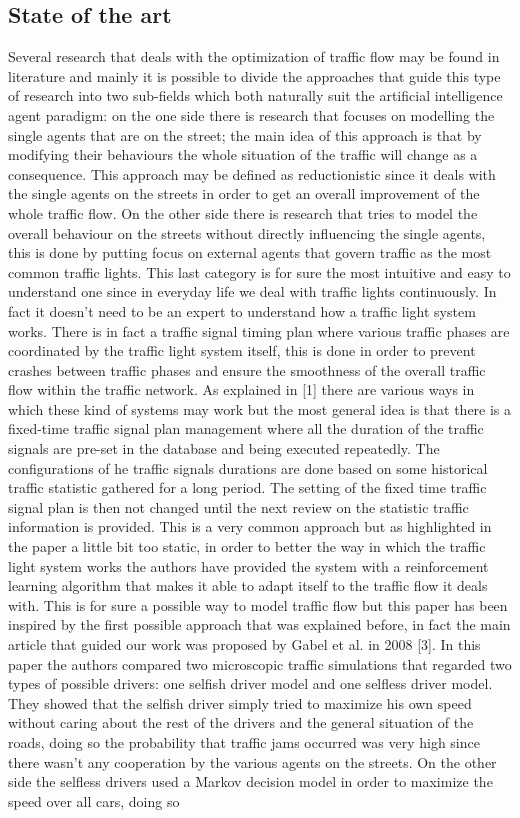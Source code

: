 \documentclass[a4paper,hidelinks]{article}
\begin{document}
\subsection{State of the art}
Several research that deals with the optimization of traffic flow may be found in literature and mainly it is possible to divide the approaches that guide this type of research into two sub-fields which both naturally suit the artificial intelligence agent paradigm: on the one side there is research that focuses on modelling the single agents that are on the street; the main idea of this approach is that by modifying their behaviours the whole situation of the traffic will change as a consequence. This approach may be defined as reductionistic since it deals with the single agents on the streets in order to get an overall improvement of the whole traffic flow. On the other side there is research that tries to model the overall behaviour on the streets without directly influencing the single agents, this is done by putting focus on external agents that govern traffic as the most common traffic lights. This last category is for sure the most intuitive and easy to understand one since in everyday life we deal with traffic lights continuously. In fact it doesn't need to be an expert to understand how a traffic light system works. There is in fact a traffic signal timing plan where various traffic phases are coordinated by the traffic light system itself, this is done in order to prevent crashes between traffic phases and ensure the smoothness of the overall traffic flow within the traffic network. As explained in [1] there are various ways in which these kind of systems may work but the most general idea is that there is a fixed-time traffic signal plan management where all the duration of the traffic signals are pre-set in the database and being executed repeatedly. The configurations of he traffic signals durations are done based on some historical traffic statistic gathered for a long period. The setting of the fixed time traffic signal plan is then not changed until the next review on the statistic traffic information is provided. This is a very common approach but as highlighted in the paper a little bit too static, in order to better the way in which the traffic light system works the authors have provided the system with a reinforcement learning algorithm that makes it able to adapt itself to the traffic flow it deals with. This is for sure a possible way to model traffic flow but this paper has been inspired by the first possible approach that was explained before, in fact the main article that guided our work was proposed by Gabel et al. in 2008 [3]. In this paper the authors compared two microscopic traffic simulations that regarded two types of possible drivers: one selfish driver model and one selfless driver model. They showed that the selfish driver simply tried to maximize his own speed without caring about the rest of the drivers and the general situation of the roads, doing so the probability that traffic jams occurred was very high since there wasn't any cooperation by the various agents on the streets. On the other side the selfless drivers used a Markov decision model in order to maximize the speed over all cars, doing so 
\end{document}

